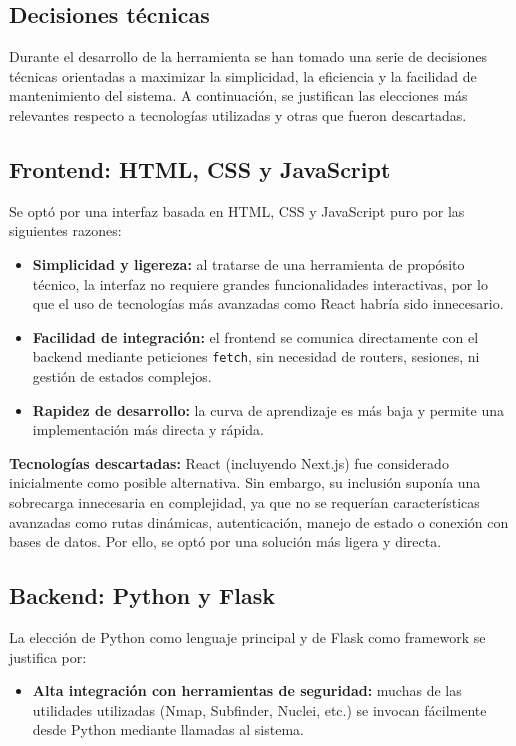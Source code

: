 \begin{parskipenv}
\section{Decisiones técnicas}
Durante el desarrollo de la herramienta se han tomado una serie de decisiones técnicas orientadas a maximizar la simplicidad, la eficiencia y la facilidad de mantenimiento del sistema. A continuación, se justifican las elecciones más relevantes respecto a tecnologías utilizadas y otras que fueron descartadas.

\subsection{Frontend: HTML, CSS y JavaScript}
Se optó por una interfaz basada en HTML, CSS y JavaScript puro por las siguientes razones:

\begin{itemize}
    \item \textbf{Simplicidad y ligereza:} al tratarse de una herramienta de propósito técnico, la interfaz no requiere grandes funcionalidades interactivas, por lo que el uso de tecnologías más avanzadas como React habría sido innecesario.
    
    \item \textbf{Facilidad de integración:} el frontend se comunica directamente con el backend mediante peticiones \texttt{fetch}, sin necesidad de routers, sesiones, ni gestión de estados complejos.
    
    \item \textbf{Rapidez de desarrollo:} la curva de aprendizaje es más baja y permite una implementación más directa y rápida.
\end{itemize}

\textbf{Tecnologías descartadas:} React (incluyendo Next.js) fue considerado inicialmente como posible alternativa. Sin embargo, su inclusión suponía una sobrecarga innecesaria en complejidad, ya que no se requerían características avanzadas como rutas dinámicas, autenticación, manejo de estado o conexión con bases de datos. Por ello, se optó por una solución más ligera y directa.

\subsection{Backend: Python y Flask}
La elección de Python como lenguaje principal y de Flask como framework se justifica por:

\begin{itemize}
    \item \textbf{Alta integración con herramientas de seguridad:} muchas de las utilidades utilizadas (Nmap, Subfinder, Nuclei, etc.) se invocan fácilmente desde Python mediante llamadas al sistema.
    

\end{itemize}
\end{parskipenv}
